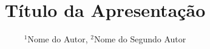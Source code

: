 \documentclass[final,hyperref={pdfpagelabels=false}]{beamer}
\title{\Huge Título da Apresentação}
\author{\Large $^1$Nome do Autor, $^2$Nome do Segundo Autor}
\institute[UNESP]{$^1$Universidade Estadual Paulista ``Júlio de Mesquita Filho", $^2$Segunda Filiação}
\begin{document}
\begin{frame}
	\begin{columns}
		
		
		
	\end{columns}
	\end{frame}
\end{document}

